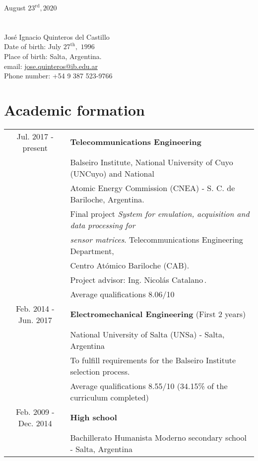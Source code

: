 \documentclass[10pt]{article}
\newcommand{\tab}{\hspace{\parindent}}
\begin{document}
{\raggedleft
August $23^{\text{rd}}, 2020$ \\
}
\\
\\
{\LARGE {José Ignacio Quinteros del Castillo}}\\

\noindent Date of birth: July $27^{\text{th}},\,\,1996$ \\
Place of birth: Salta, Argentina. \\
email: \url{jose.quinteros@ib.edu.ar} \\
Phone number: +54 9 387 523-9766

\section*{Academic formation}

\noindent \begin{tabular}{cl}

	Jul. 2017 - present	& \textbf{Telecommunications Engineering} \\
						& \tab Balseiro Institute, National University of Cuyo (UNCuyo) and National \\
						& \tab \tab Atomic Energy Commission (CNEA) - S. C. de Bariloche, Argentina. \\
						& \tab Final project \textit{System for emulation, acquisition and data processing for} \\
						& \tab \tab \textit{sensor matrices}. Telecommunications Engineering Department, \\
						& \tab \tab Centro Atómico Bariloche (CAB). \\
						& \tab Project advisor: Ing. Nicolás Catalano\,\footnotemark[1]. \\
						& \tab Average qualifications 8.06/10 \\

	Feb. 2014 - Jun. 2017	& \textbf{Electromechanical Engineering} (First 2 years) \\
						& \tab National University of Salta (UNSa) - Salta, Argentina \\
						& \tab To fulfill requirements for the Balseiro Institute selection process.\\
						& \tab Average qualifications 8.55/10 (34.15\% of the curriculum completed)\\

	Feb. 2009 - Dec. 2014	& \textbf{High school} \\ 
						& \tab Bachillerato Humanista Moderno secondary school - Salta, Argentina
\end{tabular}
\end{document}
